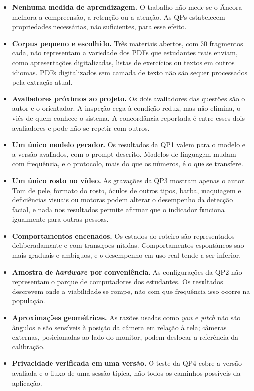 \documentclass[portuguese,oneside]{tcc}
\newcommand{\ferramenta}{Âncora\xspace}
\newcommand{\estr}[1]{\emph{#1}}
\begin{document}
\begin{itemize}
  \item \textbf{Nenhuma medida de aprendizagem.} O trabalho não mede se o \ferramenta melhora a compreensão, a retenção ou a atenção. As QPs estabelecem propriedades necessárias, não suficientes, para esse efeito.
  \item \textbf{Corpus pequeno e escolhido.} Três materiais abertos, com 30 fragmentos cada, não representam a variedade dos PDFs que estudantes reais enviam, como apresentações digitalizadas, listas de exercícios ou textos em outros idiomas. PDFs digitalizados sem camada de texto não são sequer processados pela extração atual.
  \item \textbf{Avaliadores próximos ao projeto.} Os dois avaliadores das questões são o autor e o orientador. A inspeção cega à condição reduz, mas não elimina, o viés de quem conhece o sistema. A concordância reportada é entre esses dois avaliadores e pode não se repetir com outros.
  \item \textbf{Um único modelo gerador.} Os resultados da QP1 valem para o modelo e a versão avaliados, com o prompt descrito. Modelos de linguagem mudam com frequência, e o protocolo, mais do que os números, é o que se transfere.
  \item \textbf{Um único rosto no vídeo.} As gravações da QP3 mostram apenas o autor. Tom de pele, formato do rosto, óculos de outros tipos, barba, maquiagem e deficiências visuais ou motoras podem alterar o desempenho da detecção facial, e nada nos resultados permite afirmar que o indicador funciona igualmente para outras pessoas.
  \item \textbf{Comportamentos encenados.} Os estados do roteiro são representados deliberadamente e com transições nítidas. Comportamentos espontâneos são mais graduais e ambíguos, e o desempenho em uso real tende a ser inferior.
  \item \textbf{Amostra de \estr{hardware} por conveniência.} As configurações da QP2 não representam o parque de computadores dos estudantes. Os resultados descrevem onde a viabilidade se rompe, não com que frequência isso ocorre na população.
  \item \textbf{Aproximações geométricas.} As razões usadas como \estr{yaw} e \estr{pitch} não são ângulos e são sensíveis à posição da câmera em relação à tela; câmeras externas, posicionadas ao lado do monitor, podem deslocar a referência da calibração.
  \item \textbf{Privacidade verificada em uma versão.} O teste da QP4 cobre a versão avaliada e o fluxo de uma sessão típica, não todos os caminhos possíveis da aplicação.
\end{itemize}
\end{document}
